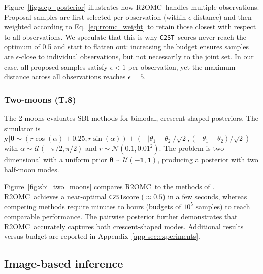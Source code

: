 \documentclass[twoside]{article}
\newlength{\secvspace}
\newlength{\subsecvspace}
\newcommand{\thb}{\boldsymbol{\theta}}
\newcommand{\yb}{\mathbf{y}}
\newcommand{\rromc}{R2OMC}
\newcommand{\CtwoST}{\texttt{C2ST}}
\begin{document}
Figure~\ref{fig:slcp_posterior} illustrates how \rromc~handles multiple observations.
Proposal samples are first selected per observation (within $\epsilon$-distance) and then weighted according to Eq.~\ref{eq:rromc_weight} to retain those closest with respect to all observations.
We speculate that this is why \CtwoST~scores never reach the optimum of 0.5 and start to flatten out: increasing the budget ensures samples are $\epsilon$-close to individual observations, but not necessarily to the joint set. 
In our case, all proposed samples satisfy $\epsilon < 1$ per observation, yet the maximum distance across all observations reaches $\epsilon = 5$.


\vspace{-1ex}
\subsubsection{Two-moons (T.8)}


The 2-moons evaluates SBI methods for bimodal, crescent-shaped posteriors.
The simulator is $\yb|\thb \sim  (r\cos(\alpha) + 0.25, r \sin(\alpha)) + (-|\theta_1 + \theta_2| / \sqrt{2}, (-\theta_1 + \theta_2) / \sqrt{2})$ with $\alpha \sim \mathcal{U}(-\pi/2, \pi/2)$ and $r \sim \mathcal{N}(0.1, 0.01^2)$.
The problem is two-dimensional with a uniform prior $\thb \sim \mathcal{U}(\mathbf{-1}, \mathbf{1})$, 
producing a posterior with two half-moon modes.

Figure~\ref{fig:sbi_two_moons} compares \rromc~to the methods of \citet{lueckmann2021benchmarking}.
\rromc~achieves a near-optimal \CtwoST score ($\approx 0.5$) in a few seconds,
whereas competing methods require minutes to hours (budgets of $10^5$ samples) to reach comparable performance.
The pairwise posterior further demonstrates that \rromc~accurately captures both crescent-shaped modes. Additional results versus budget are reported in Appendix~\ref{app-sec:experiments}.


\vspace{\subsecvspace}
\subsection{Image-based inference}
\vspace{\subsecvspace}
\label{subsec:image-based}
\end{document}

